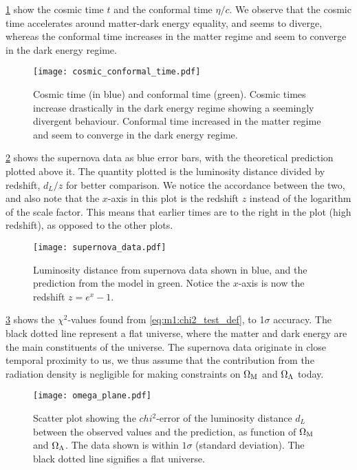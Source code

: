     \cref{fig:m1:cosmic_conformal_time} show the cosmic time $t$ and the conformal time $\eta/c$. We observe that the cosmic time accelerates around matter-dark energy equality, and seems to diverge, whereas the conformal time increases in the matter regime and seem to converge in the dark energy regime.

    \begin{figure}
        \texttt{[image: cosmic\_conformal\_time.pdf]}
        \caption{Cosmic time (in blue) and conformal time (green). Cosmic times increase drastically in the dark energy regime showing a seemingly divergent behaviour. Conformal time increased in the matter regime and seem to converge in the dark energy regime.}
        \label{fig:m1:cosmic_conformal_time}
    \end{figure}

    \cref{fig:m1:supernova_data} shows the supernova data as blue error bars, with the theoretical prediction plotted above it. The quantity plotted is the luminosity distance divided by redshift, $d_L/z$ for better comparison. We notice the accordance between the two, and also note that the $x$-axis in this plot is the redshift $z$ instead of the logarithm of the scale factor. This means that earlier times are to the right in the plot (high redshift), as opposed to the other plots. 

    \begin{figure}
        \texttt{[image: supernova\_data.pdf]}
        \caption{Luminosity distance from supernova data shown in blue, and the prediction from the model in green. Notice the $x$-axis is now the redshift $z=e^x-1$.}
        \label{fig:m1:supernova_data}
    \end{figure}

    \cref{fig:m1:omega_planes} shows the $\chi^2$-values found from \cref{eq:m1:chi2_test_def}, to 1$\sigma$ accuracy. The black dotted line represent a flat universe, where the matter and dark energy are the main constituents of the universe. The supernova data originate in close temporal proximity to us, we thus assume that the contribution from the radiation density is negligible for making constraints on $\Omega_\mathrm{M}$ and $\Omega_\Lambda$ today. 

    \begin{figure}
        \texttt{[image: omega\_plane.pdf]}
        \caption{Scatter plot showing the $chi^2$-error of the luminosity distance $d_L$ between the observed values and the prediction, as function of $\Omega_\mathrm{M}$ and $\Omega_\Lambda$. The data shown is within $1\sigma$ (standard deviation). The black dotted line signifies a flat universe. }
        \label{fig:m1:omega_planes}
    \end{figure}

